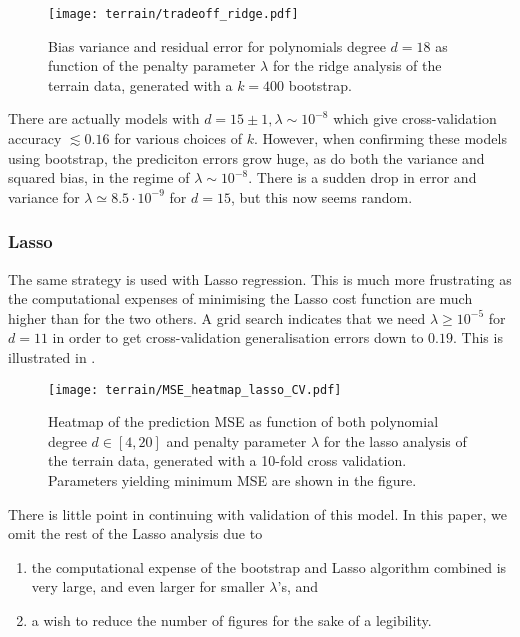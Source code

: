         \begin{figure}
            \texttt{[image: terrain/tradeoff\_ridge.pdf]}
            \caption{Bias variance and residual error for polynomials degree $d=18$ as function of the penalty parameter $\lambda$ for the ridge analysis of the terrain data, generated with a $k=400$ bootstrap.}
            \label{fig:gc_bias_variance_ridge}
        \end{figure}

        \par

        There are actually models with $d=15\pm 1, \lambda\sim  10^{-8}$ which give cross-validation accuracy $\lesssim 0.16$ for various choices of $k$. However, when confirming these models using bootstrap, the prediciton errors grow huge, as do both the variance and squared bias, in the regime of $\lambda\sim 10^{-8}$. There is a sudden drop in error and variance for $\lambda \simeq 8.5 \cdot 10^{-9}$ for $d=15$, but this now seems random.


        \subsubsection{Lasso}\label{sec:gc_lassoanalysis}

        The same strategy is used with Lasso regression. This is much more frustrating as the computational expenses of minimising the Lasso cost function are much higher than for the two others. A grid search indicates that we need $\lambda \geq 10^{-5}$ for $d=11$ in order to get cross-validation generalisation errors down to $0.19$. This is illustrated in .

        \begin{figure}
            \texttt{[image: terrain/MSE\_heatmap\_lasso\_CV.pdf]}
            \caption{Heatmap of the prediction MSE as function of both polynomial degree $d\in[4,20]$ and penalty parameter $\lambda$ for the lasso analysis of the terrain data, generated with a 10-fold cross validation. Parameters yielding minimum MSE are shown in the figure.}
            \label{fig:gc_gridsearch_lasso}
        \end{figure}

        There is little point in continuing with validation of this model. In this paper, we omit the rest of the Lasso analysis due to 

        \begin{enumerate}[label=(\roman*)]
            \item the computational expense of the bootstrap and Lasso algorithm combined is very large, and even larger for smaller $\lambda$'s, and
            \item a wish to reduce the number of figures for the sake of a legibility.
        \end{enumerate}

      





    